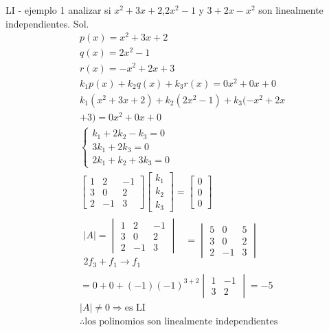 \begin{Example*} {LI - ejemplo 1}
	analizar si $x^2+3x+2$,$2x^2-1$ y $3+2x-x^2$ son linealmente independientes.
	Sol.
	\begin{align*}
		&p(x)=x^2+3x+2\\
		&q(x)=2x^2-1\\
		&r(x)=-x^2+2x+3\\
		&k_1p(x)+k_2q(x)+k_3r(x)=0x^2+0x+0\\
		&k_1(x^2+3x+2)+k_2(2x^2-1)+k_3(-x^2+2x\\
		&+3)=0x^2+0x+0\\
		&\left\{\begin{array}{r}
			k_1+2k_2-k_3=0\\
			3k_1+2k_3=0\\
			2k_1+k_2+3k_3=0
		\end{array}\right.\\
		&\begin{bmatrix}
			1&2&-1\\
			3&0&2\\
			2&-1&3
		\end{bmatrix}\begin{bmatrix}
			k_1\\k_2\\k_3
		\end{bmatrix}=\begin{bmatrix}
			0\\0\\0
		\end{bmatrix}\\
		&\begin{array}{r}
			|A|=\begin{vmatrix}
				1&2&-1\\
				3&0&2\\
				2&-1&3
			\end{vmatrix}\\
			2f_3+f_1\rightarrow f_1
		\end{array}\begin{array}{c}
			=\begin{vmatrix}
				5&0&5\\
				3&0&2\\
				2&-1&3
			\end{vmatrix}\\
			\
		\end{array}\\
		&=0+0+(-1)(-1)^{3+2}\begin{vmatrix}
			1&-1\\
			3&2
		\end{vmatrix}=-5\\
		&|A|\ne 0 \Rightarrow \text{es LI}\\
		&\therefore \text{los polinomios son linealmente independientes}
	\end{align*}
\end{Example*}